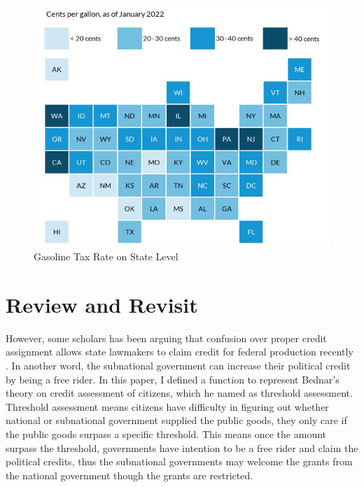 \begin{figure}[H]
    \centering
    \includegraphics[scale=0.6]{Chapter-5/Figures/fuel tax2.JPG}
    \caption{Gasoline Tax Rate on State Level
        \texttt{} }
    \label{gastax}
\end{figure}




\section{Review and Revisit}
However, some scholars has been arguing that confusion over proper credit assignment allows state lawmakers to claim credit for federal production recently \cite{nicholson2011claiming,bednar2007credit}. In another word, the subnational government can increase their political credit by being a free rider. In this paper, I defined a function to represent Bednar's \cite{bednar2007credit} theory on credit assessment of citizens, which he named as threshold assessment. Threshold assessment means citizens have difficulty in figuring out whether national or subnational government supplied the public goods, they only care if the public goods surpass a specific threshold. This means once the amount surpass the threshold, governments have intention to be a free rider and claim the political credits, thus the subnational governments may welcome the grants from the national government though the grants are restricted.


